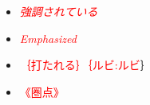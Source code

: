 \documentclass[]{jlreq} \usepackage{mystyle}
\title{}
\author{江口聡}
\begin{document}
\maketitle
\begin{itemize}
\item \textcolor{red}{\emph{強調されている}}


\item \textcolor{red}{\emph{Emphasized}}


\item \textcolor{red}{｛打たれる｝｛ルビ:ルビ}｝


\item \textcolor{red}{《圏点》}

\end{itemize}



% 
% 
\end{document}

